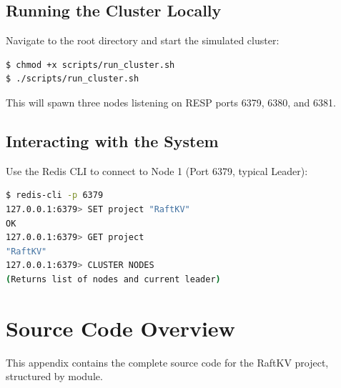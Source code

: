\documentclass[12pt,a4paper]{report}
\begin{document}
\section{Running the Cluster Locally}
Navigate to the root directory and start the simulated cluster:
\begin{lstlisting}[language=bash]
$ chmod +x scripts/run_cluster.sh
$ ./scripts/run_cluster.sh
\end{lstlisting}
This will spawn three nodes listening on RESP ports 6379, 6380, and 6381.

\section{Interacting with the System}
Use the Redis CLI to connect to Node 1 (Port 6379, typical Leader):
\begin{lstlisting}[language=bash]
$ redis-cli -p 6379
127.0.0.1:6379> SET project "RaftKV"
OK
127.0.0.1:6379> GET project
"RaftKV"
127.0.0.1:6379> CLUSTER NODES
(Returns list of nodes and current leader)
\end{lstlisting}

\chapter{Source Code Overview}
This appendix contains the complete source code for the RaftKV project, structured by module.
\end{document}
